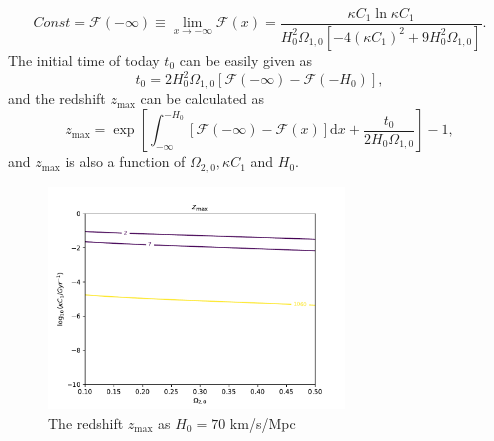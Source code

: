 \documentclass[twocolumn]{aastex631}
\begin{document}
   \begin{equation}
      Const=\mathcal{F}(-\infty)\equiv\lim_{x\to-\infty}\mathcal{F}(x)=
      \frac{\kappa C_1\ln\kappa C_1}{H_0^2\Omega_{1,0}[-4(\kappa C_1)^2+9H_0^2\Omega_{1,0}]}.
   \end{equation}
   The initial time of today $t_0$ can be easily given as
   \begin{equation}
      t_0=2H_0^2\Omega_{1,0}[\mathcal{F}(-\infty)-\mathcal{F}(-H_0)],
   \end{equation}
   and the redshift $z_{\max}$ can be calculated as
   \begin{equation}
      z_{\max}=\exp\left[\int_{-\infty}^{-H_0}[\mathcal{F}(-\infty)
      -\mathcal{F}(x)]\mathrm{d}x+\frac{t_0}{2H_0\Omega_{1,0}}\right]-1,
   \end{equation}
   and $z_{\max}$ is also a function of $\Omega_{2,0}, \kappa C_1$ and $H_0$.
   \begin{figure}[htbp]
      \centering
      \includegraphics[width=0.7\textwidth]{zmax.pdf}
      \caption{The redshift $z_{\max}$ as $H_0=70$ km/s/Mpc}
   \end{figure}



\end{document}
